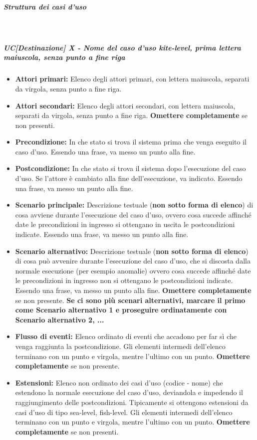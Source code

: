\subparagraph*{Struttura dei casi d'uso}\mbox{}\\
\subparagraph*{UC[Destinazione] X - Nome del caso d'uso kite-level, prima lettera maiuscola, senza punto a fine riga} %
\begin{itemize}
\item \textbf{Attori primari:} Elenco degli attori primari, con lettera maiuscola, separati da virgola, senza punto a fine riga.
\item \textbf{Attori secondari:} Elenco degli attori secondari, con lettera maiuscola, separati da virgola, senza punto a fine riga. \textbf{Omettere completamente} se non presenti.
\item \textbf{Precondizione:} In che stato si trova il sistema prima che venga eseguito il caso d'uso. Essendo una frase, va messo un punto alla fine.
\item \textbf{Postcondizione:} In che stato si trova il sistema dopo l'esecuzione del caso d'uso. Se l'attore è cambiato alla fine dell'esecuzione, va indicato. Essendo una frase, va messo un punto alla fine.
\item \textbf{Scenario principale:} Descrizione testuale (\textbf{non sotto forma di elenco}) di cosa avviene durante l'esecuzione del caso d'uso, ovvero cosa succede affinché date le precondizioni in ingresso si ottengano in uscita le postcondizioni indicate. Essendo una frase, va messo un punto alla fine.
\item \textbf{Scenario alternativo:} Descrizione testuale (\textbf{non sotto forma di elenco}) di cosa può avvenire durante l'esecuzione del caso d'uso, che si discosta dalla normale esecuzione (per esempio anomalie) ovvero cosa succede affinché date le precondizioni in ingresso non si ottengano le postcondizioni indicate. Essendo una frase, va messo un punto alla fine. \textbf{Omettere completamente} se non presente. \textbf{Se ci sono più scenari alternativi, marcare il primo come Scenario alternativo 1 e proseguire ordinatamente con Scenario alternativo 2, ...}
\item \textbf{Flusso di eventi:} Elenco ordinato di eventi che accadono per far sì che venga raggiunta la postcondizione. Gli elementi intermedi dell'elenco terminano con un punto e virgola, mentre l'ultimo con un punto. \textbf{Omettere completamente} se non presente.
\item \textbf{Estensioni:} Elenco non ordinato dei casi d'uso (codice - nome) che estendono la normale esecuzione del caso d'uso, deviandola e impedendo il raggiungimento delle postcondizioni. Tipicamente si ottengono estensioni da casi d'uso di tipo sea-level, fish-level. Gli elementi intermedi dell'elenco terminano con un punto e virgola, mentre l'ultimo con un punto. \textbf{Omettere completamente} se non presenti.

\end{itemize}
